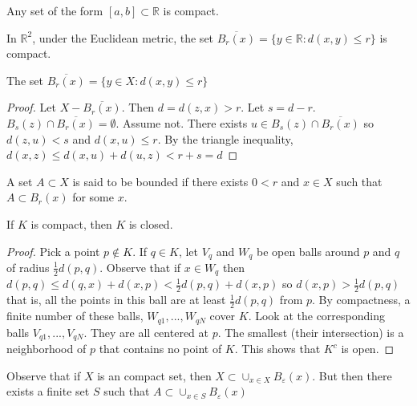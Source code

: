 \documentclass{article}
\newcommand{\R}{\mathbb{R}}
\newcommand{\eps}{\varepsilon}
\begin{document}
\begin{example}
Any set of the form $[a,b]\subset\R$ is compact.
\end{example}
\begin{example}
In $\R^2$, under the Euclidean metric, the set $\overline{B_r(x)}=\{y\in \R:d(x,y)\leq r\}$ is compact.
\end{example}
\begin{proposition}
The set $\overline{B_r(x)}=\{y\in X:d(x,y)\leq r\}$
\end{proposition}
\begin{proof}
Let $X-\overline{B_r(x)}$. Then $d=d(z,x)>r$. Let $s=d-r$. $B_s(z)\cap \overline{B_r(x)}=\emptyset$. Assume not. There exists $u\in B_s(z)\cap \overline{B_r(x)}$ so $d(z,u)<s$ and $d(x,u)\leq r$. By the triangle inequality, $d(x,z)\leq d(x,u)+d(u,z)<r+s=d$
\end{proof}
\begin{definition}
A set $A\subset X$ is said to be bounded if there exists $0<r$ and $x\in X$ such that $A\subset B_r(x)$ for some $x$.
\end{definition}
\begin{lemma}
If $K$ is compact, then $K$ is closed.
\end{lemma}
\begin{proof}
Pick a point $p\notin K$. If $q\in K$, let $V_q$ and $W_q$ be open balls around $p$ and $q$ of radius $\frac{1}{2}d(p,q)$. Observe that if $x\in W_q$ then $d(p,q)\leq d(q,x)+d(x,p)<\frac{1}{2}d(p,q)+d(x,p)$ so $d(x,p)>\frac{1}{2}d(p,q)$ that is, all the points in this ball are at least $\frac{1}{2}d(p,q)$ from $p$. By compactness, a finite number of these balls, $W_{q1},...,W_{qN}$ cover $K$. Look at the corresponding balls $V_{q1},...,V_{qN}$. They are all centered at $p$. The smallest (their intersection) is a neighborhood of $p$ that contains no point of $K$. This shows that $K^c$ is open.
\end{proof}
Observe that if $X$ is an compact set, then $X\subset\cup_{x\in X}B_\eps(x)$. But then there exists a finite set $S$ such that $A\subset\cup_{x\in S}B_\eps(x)$
\end{document}
